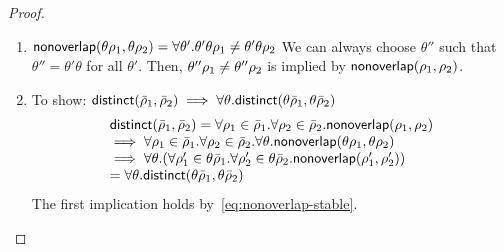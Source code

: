 \begin{proof}

  \begin{enumerate}

  \item \label{eq:nonoverlap-stable}

    ${\sf nonoverlap}(\theta \rho_1, \theta \rho_2) = \forall
    \theta'. \theta' \theta \rho_1 \ne \theta' \theta \rho_2$ We
    can always choose $\theta''$ such that $\theta'' = \theta' \theta$
    for all $\theta'$. Then, $\theta'' \rho_1 \ne \theta'' \rho_2$
    is implied by ${\sf nonoverlap}(\rho_1, \rho_2)$.

  \item To show: ${\sf distinct}(\bar{\rho}_1, \bar{\rho}_2) \implies
    \forall \theta. {\sf distinct}(\theta \bar{\rho}_1, \theta \bar{\rho}_2)$
    \[
    \begin{array}{l}
      {\sf distinct}(\bar{\rho}_1, \bar{\rho}_2) = 
      \forall \rho_1 \in \bar{\rho}_1.
      \forall \rho_2 \in \bar{\rho}_2. 
      {\sf nonoverlap}(\rho_1, \rho_2) \\
      \implies \forall \rho_1 \in \bar{\rho}_1.
      \forall \rho_2 \in \bar{\rho}_2. 
      \forall \theta. 
      {\sf nonoverlap}(\theta \rho_1, \theta \rho_2) \\
      \implies \forall \theta. 
      (\forall \rho_1' \in \theta \bar{\rho}_1.
      \forall \rho_2' \in \theta \bar{\rho}_2. 
      {\sf nonoverlap}(\rho_1', \rho_2')) \\
      = \forall \theta. 
      {\sf distinct}(\theta \bar{\rho}_1, \theta \bar{\rho}_2)
    \end{array}
    \]
    The first implication holds by~\ref{eq:nonoverlap-stable}.


\end{enumerate}
\end{proof}
